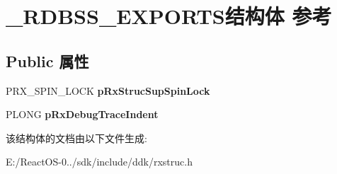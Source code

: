 \hypertarget{struct___r_d_b_s_s___e_x_p_o_r_t_s}{}\section{\+\_\+\+R\+D\+B\+S\+S\+\_\+\+E\+X\+P\+O\+R\+T\+S结构体 参考}
\label{struct___r_d_b_s_s___e_x_p_o_r_t_s}
\subsection*{Public 属性}
\begin{DoxyCompactItemize}
\item 
\mbox{\label{struct___r_d_b_s_s___e_x_p_o_r_t_s_a14ea075c28c347a1db9438f58d69ee2e}} 
P\+R\+X\+\_\+\+S\+P\+I\+N\+\_\+\+L\+O\+CK {\bfseries p\+Rx\+Struc\+Sup\+Spin\+Lock}
\item 
\mbox{\label{struct___r_d_b_s_s___e_x_p_o_r_t_s_ac3c3501fb0c773cac6603a6fbda44497}} 
P\+L\+O\+NG {\bfseries p\+Rx\+Debug\+Trace\+Indent}
\end{DoxyCompactItemize}


该结构体的文档由以下文件生成\+:\begin{DoxyCompactItemize}
\item 
E\+:/\+React\+O\+S-\/0../sdk/include/ddk/rxstruc.\+h\end{DoxyCompactItemize}
